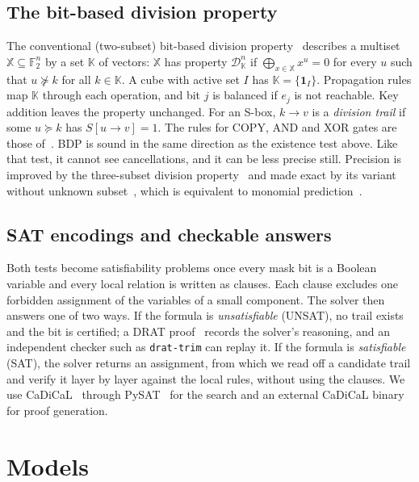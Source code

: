 \documentclass[11pt,a4paper]{article}
\theoremstyle{definition}
\theoremstyle{remark}
\newcommand{\F}{\mathbb{F}_2}
\begin{document}
\subsection{The bit-based division property}
The conventional (two-subset) bit-based division property~\cite{todo2016bit} describes a multiset $\mathbb X\subseteq\F^n$ by a set $\mathbb K$ of vectors: $\mathbb X$ has property $\mathcal D^n_{\mathbb K}$ if $\bigoplus_{x\in\mathbb X}x^u=0$ for every $u$ such that $u\not\succeq k$ for all $k\in\mathbb K$. A cube with active set $I$ has $\mathbb K=\{\mathbf 1_I\}$. Propagation rules map $\mathbb K$ through each operation, and bit $j$ is balanced if $e_j$ is not reachable. Key addition leaves the property unchanged. For an S-box, $k\to v$ is a \emph{division trail} if some $u\succeq k$ has $S[u\to v]=1$. The rules for COPY, AND and XOR gates are those of~\cite{todo2016bit,xiang2016milp}. BDP is sound in the same direction as the existence test above. Like that test, it cannot see cancellations, and it can be less precise still. Precision is improved by the three-subset division property~\cite{huwang2019} and made exact by its variant without unknown subset~\cite{hao2020}, which is equivalent to monomial prediction~\cite{hu2020mp}.

\subsection{SAT encodings and checkable answers}
Both tests become satisfiability problems once every mask bit is a Boolean variable and every local relation is written as clauses. Each clause excludes one forbidden assignment of the variables of a small component. The solver then answers one of two ways. If the formula is \emph{unsatisfiable} (UNSAT), no trail exists and the bit is certified; a DRAT proof~\cite{drattrim2014} records the solver's reasoning, and an independent checker such as \texttt{drat-trim} can replay it. If the formula is \emph{satisfiable} (SAT), the solver returns an assignment, from which we read off a candidate trail and verify it layer by layer against the local rules, without using the clauses. We use CaDiCaL~\cite{cadical2020,cadical2024} through PySAT~\cite{pysat2018} for the search and an external CaDiCaL binary for proof generation.

\section{Models}\label{sec:models}
\end{document}
